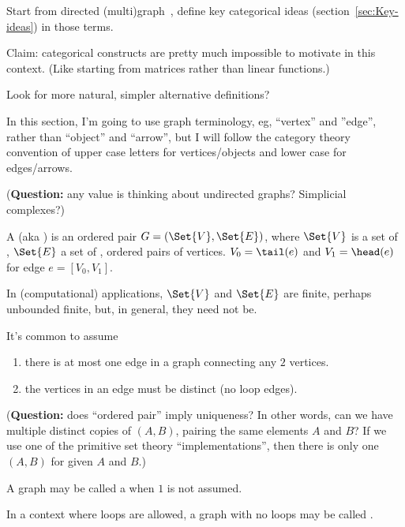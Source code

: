 \documentclass[11pt,openany]{book}
\begin{document}
Start from directed (multi)graph~\cite{wiki:DirectedGraph},
define key categorical ideas (section~\ref{sec:Key-ideas}) 
in those terms.

Claim: categorical constructs are 
pretty much impossible to motivate in this context.
(Like starting from matrices rather than linear functions.)

Look for more natural, simpler alternative definitions?

In this section, I'm going to use graph terminology,
eg, ``vertex'' and ''edge'', rather than ``object'' and ``arrow'',
but I will follow the category theory convention of
upper case letters for vertices/objects and lower case for
edges/arrows.

\label{sec:Directed_graph}

(\textbf{Question:}
 any value is thinking about undirected graphs?
 Simplicial complexes?)

\begin{definition}
A  (aka ) is
an ordered pair $G=\left( \Set{V}, \Set{E} \right)$,
where $\Set{V}$ is a set of , 
$\Set{E}$ a set of , ordered pairs of vertices.
$V_0 = \tail(e)$ and $V_1 = \head(e)$
for edge $e = \left[ V_0, V_1 \right]$.
\end{definition}

In (computational) applications, $\Set{V}$ and $\Set{E}$ 
are finite, perhaps unbounded finite,
but, in general, they need not be.

It's common to assume 
\begin{enumerate}
\item there is at most one edge
in a graph connecting any $2$ vertices.\par
\item the vertices in an edge must be 
distinct (no loop edges).
\end{enumerate}
(\textbf{Question:} does ``ordered pair'' imply uniqueness?
In other words, can we have multiple distinct copies of
 $\left(A,B\right)$, pairing the same elements $A$ and $B$?
 If we use one of the primitive set theory ``implementations'',
 then there is only one $\left(A,B\right)$ 
 for given $A$ and $B$.)

A graph may be called a  when $1$ is
not assumed.

In a context where loops are allowed,
a graph with no loops may be called 
.
\end{document}
